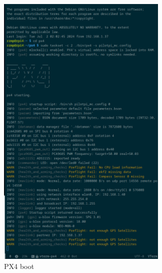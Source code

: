 \begin{figure}[htb!]
  \centering
  \begin{subfigure}[t]{.48\textwidth}
    \includegraphics[width=0.89\textwidth]{./img/png/px4-qgc-cam-2}
  \caption{PX4 boot}%
  \label{fig:px4-qgc-cam-2}
  \end{subfigure}
%
  \begin{subfigure}[t]{.48\textwidth}

\end{subfigure}
\end{figure}
